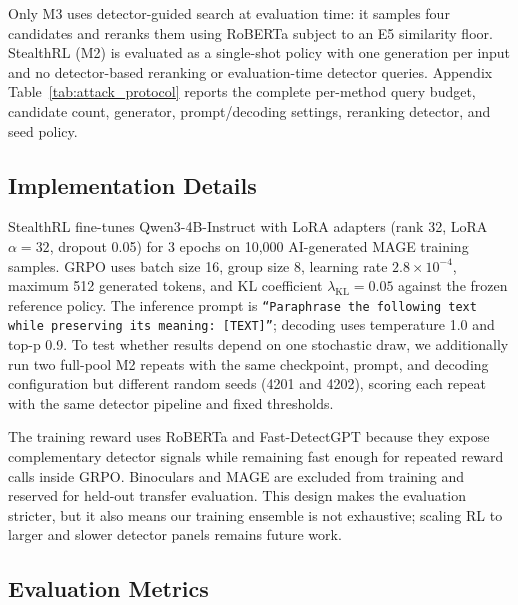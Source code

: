 \documentclass[11pt]{article}
\begin{document}
Only M3 uses detector-guided search at evaluation time: it samples four candidates and reranks them using RoBERTa subject to an E5 similarity floor. StealthRL (M2) is evaluated as a single-shot policy with one generation per input and no detector-based reranking or evaluation-time detector queries. Appendix Table~\ref{tab:attack_protocol} reports the complete per-method query budget, candidate count, generator, prompt/decoding settings, reranking detector, and seed policy.

\subsection{Implementation Details}
\label{sec:implementation}

StealthRL fine-tunes Qwen3-4B-Instruct with LoRA adapters (rank 32, LoRA $\alpha=32$, dropout 0.05) for 3 epochs on 10,000 AI-generated MAGE training samples. GRPO uses batch size 16, group size 8, learning rate $2.8 \times 10^{-4}$, maximum 512 generated tokens, and KL coefficient $\lambda_{\text{KL}}=0.05$ against the frozen reference policy. The inference prompt is \texttt{``Paraphrase the following text while preserving its meaning: [TEXT]''}; decoding uses temperature 1.0 and top-p 0.9. To test whether results depend on one stochastic draw, we additionally run two full-pool M2 repeats with the same checkpoint, prompt, and decoding configuration but different random seeds (4201 and 4202), scoring each repeat with the same detector pipeline and fixed thresholds.

The training reward uses RoBERTa and Fast-DetectGPT because they expose complementary detector signals while remaining fast enough for repeated reward calls inside GRPO. Binoculars and MAGE are excluded from training and reserved for held-out transfer evaluation. This design makes the evaluation stricter, but it also means our training ensemble is not exhaustive; scaling RL to larger and slower detector panels remains future work.

\subsection{Evaluation Metrics}
\end{document}
